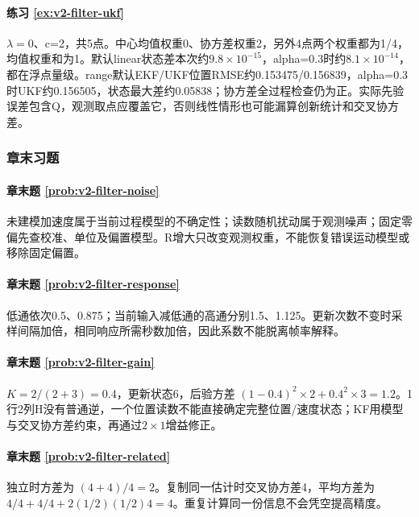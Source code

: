 \paragraph*{练习 \ref{ex:v2-filter-ukf}}
\begin{solution}
$\lambda=0$、c=2，共5点。中心均值权重0、协方差权重2，另外4点两个权重都为1/4，均值权重和为1。默认linear状态差本次约$9.8\times10^{-15}$，alpha=0.3时约$8.1\times10^{-14}$，都在浮点量级。range默认EKF/UKF位置RMSE约0.153475/0.156839，alpha=0.3时UKF约0.156505，状态最大差约0.05838；协方差全过程检查仍为正。实际先验误差包含Q，观测取点应覆盖它，否则线性情形也可能漏算创新统计和交叉协方差。
\end{solution}

\subsubsection*{章末习题}

\paragraph*{章末题 \ref{prob:v2-filter-noise}}
\begin{solution}
未建模加速度属于当前过程模型的不确定性；读数随机扰动属于观测噪声；固定零偏先查校准、单位及偏置模型。R增大只改变观测权重，不能恢复错误运动模型或移除固定偏置。
\end{solution}

\paragraph*{章末题 \ref{prob:v2-filter-response}}
\begin{solution}
低通依次0.5、0.875；当前输入减低通的高通分别1.5、1.125。更新次数不变时采样间隔加倍，相同响应所需秒数加倍，因此系数不能脱离帧率解释。
\end{solution}

\paragraph*{章末题 \ref{prob:v2-filter-gain}}
\begin{solution}
$K=2/(2+3)=0.4$，更新状态6，后验方差 $(1-0.4)^2\times2+0.4^2\times3=1.2$。1行2列H没有普通逆，一个位置读数不能直接确定完整位置/速度状态；KF用模型与交叉协方差约束，再通过$2\times1$增益修正。
\end{solution}

\paragraph*{章末题 \ref{prob:v2-filter-related}}
\begin{solution}
独立时方差为 $(4+4)/4=2$。复制同一估计时交叉协方差4，平均方差为 $4/4+4/4+2(1/2)(1/2)4=4$。重复计算同一份信息不会凭空提高精度。
\end{solution}

